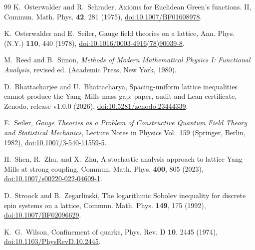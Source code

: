\documentclass[aps,prd,twocolumn,superscriptaddress,nofootinbib,floatfix]{revtex4-2}
\theoremstyle{definition}
\theoremstyle{remark}
\begin{document}
\begin{thebibliography}{99}
K.~Osterwalder and R.~Schrader, Axioms for Euclidean Green's functions.
II, Commun. Math. Phys. \textbf{42}, 281 (1975),
\href{https://doi.org/10.1007/BF01608978}{doi:10.1007/BF01608978}.

K.~Osterwalder and E.~Seiler, Gauge field theories on a lattice, Ann.
Phys. (N.Y.) \textbf{110}, 440 (1978),
\href{https://doi.org/10.1016/0003-4916(78)90039-8}{doi:10.1016/0003-4916(78)90039-8}.

M.~Reed and B.~Simon, \emph{Methods of Modern Mathematical Physics I:
Functional Analysis}, revised ed. (Academic Press, New York, 1980).

D.~Bhattacharjee and U.~Bhattacharya, Spacing-uniform lattice inequalities
cannot produce the Yang--Mills mass gap: paper, audit and Lean certificate,
Zenodo, release v1.0.0 (2026),
\href{https://doi.org/10.5281/zenodo.23444339}{doi:10.5281/zenodo.23444339}.

E.~Seiler, \emph{Gauge Theories as a Problem of Constructive Quantum Field
Theory and Statistical Mechanics}, Lecture Notes in Physics Vol.~159
(Springer, Berlin, 1982),
\href{https://doi.org/10.1007/3-540-11559-5}{doi:10.1007/3-540-11559-5}.

H.~Shen, R.~Zhu, and X.~Zhu, A stochastic analysis approach to lattice
Yang--Mills at strong coupling, Commun. Math. Phys. \textbf{400}, 805
(2023), \href{https://doi.org/10.1007/s00220-022-04609-1}{doi:10.1007/s00220-022-04609-1}.

D.~Stroock and B.~Zegarlinski, The logarithmic Sobolev inequality for
discrete spin systems on a lattice, Commun. Math. Phys. \textbf{149}, 175
(1992), \href{https://doi.org/10.1007/BF02096629}{doi:10.1007/BF02096629}.

K.~G.~Wilson, Confinement of quarks, Phys. Rev. D \textbf{10}, 2445 (1974),
\href{https://doi.org/10.1103/PhysRevD.10.2445}{doi:10.1103/PhysRevD.10.2445}.

\end{thebibliography}
\end{document}
